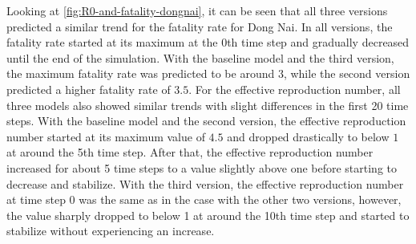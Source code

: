 Looking at \autoref{fig:R0-and-fatality-dongnai}, it can be seen that all three versions predicted a similar trend for the fatality rate for Dong Nai.
In all versions, the fatality rate started at its maximum at the 0th time step and gradually decreased until the end of the simulation.
With the baseline model and the third version, the maximum fatality rate was predicted to be around $3$, while the second version predicted a higher fatality rate of $3.5$.
For the effective reproduction number, all three models also showed similar trends with slight differences in the first 20 time steps.
With the baseline model and the second version, the effective reproduction number started at its maximum value of $4.5$ and dropped drastically to below $1$ at around the 5th time step.
After that, the effective reproduction number increased for about 5 time steps to a value slightly above one before starting to decrease and stabilize.
With the third version, the effective reproduction number at time step 0 was the same as in the case with the other two versions, however, the value sharply dropped to below 1 at around the 10th time step and started to stabilize without experiencing an increase.

